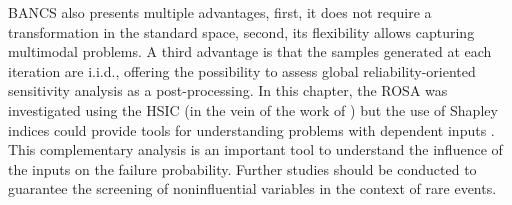 BANCS also presents multiple advantages, first, it does not require a transformation in the standard space, second, its flexibility allows capturing multimodal problems. 
A third advantage is that the samples generated at each iteration are i.i.d., offering the possibility to assess global reliability-oriented sensitivity analysis as a post-processing. 
In this chapter, the ROSA was investigated using the HSIC (in the vein of the work of \citealp{marrel_chabridon_2021}) but the use of Shapley indices could provide tools for understanding problems with dependent inputs \citep{ilidrissi_2021_rosa}.
This complementary analysis is an important tool to understand the influence of the inputs on the failure probability. 
Further studies should be conducted to guarantee the screening of noninfluential variables in the context of rare events. 


%    
